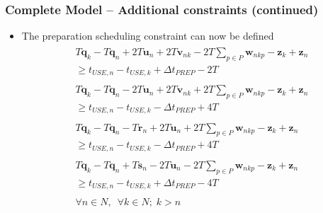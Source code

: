 \documentclass{beamer}
\begin{document}
\begin{frame}
    \frametitle{Complete Model -- Additional constraints (continued)}
    \begin{itemize}
    \item The preparation scheduling constraint can now be defined
    \begin{equation}
            \begin{split}
                \begin{aligned}
                    T \boldsymbol{q}_{k} - T \boldsymbol{q}_{n}
                    + 2T \boldsymbol{u}_{n} + 2T \boldsymbol{v}_{nk}
                    - 2T \sum_{p \in P} \boldsymbol{w}_{nkp} 
                    - \boldsymbol{z}_{k} + \boldsymbol{z}_{n}\\
                    \ge t_{\mathit{USE},n} - t_{\mathit{USE},k}
                    + \Delta t_{\mathit{PREP}} - 2T
                \end{aligned}\\
                \begin{aligned}
                    T \boldsymbol{q}_{k} - T \boldsymbol{q}_{n}
                    - 2T \boldsymbol{u}_{n} + 2T \boldsymbol{v}_{nk}
                    + 2T \sum_{p \in P} \boldsymbol{w}_{nkp} 
                    - \boldsymbol{z}_{k} + \boldsymbol{z}_{n}\\
                    \ge t_{\mathit{USE},n} - t_{\mathit{USE},k}
                    - \Delta t_{\mathit{PREP}} + 4T
                \end{aligned}\\
                \begin{aligned}
                    T \boldsymbol{q}_{k} - T \boldsymbol{q}_{n}
                    - T \boldsymbol{r}_{n} + 2T \boldsymbol{u}_{n}
                    + 2T \sum_{p \in P} \boldsymbol{w}_{nkp} 
                    - \boldsymbol{z}_{k} + \boldsymbol{z}_{n}\\
                    \ge t_{\mathit{USE},n} - t_{\mathit{USE},k}
                    - \Delta t_{\mathit{PREP}} + 4T
                \end{aligned}\\
                \begin{aligned}
                    T \boldsymbol{q}_{k} - T \boldsymbol{q}_{n}
                    + T \boldsymbol{s}_{n} - 2T \boldsymbol{u}_{n}
                    - 2T \sum_{p \in P} \boldsymbol{w}_{nkp} 
                    - \boldsymbol{z}_{k} + \boldsymbol{z}_{n}\\
                    \ge t_{\mathit{USE},n} - t_{\mathit{USE},k}
                    + \Delta t_{\mathit{PREP}} - 4T
                \end{aligned}\\
                \begin{aligned}
                    \forall n \in N, \enspace \forall k \in N; \; k > n
                \end{aligned}\\
            \end{split}
        \end{equation}
    \end{itemize}
\end{frame}
\end{document}
